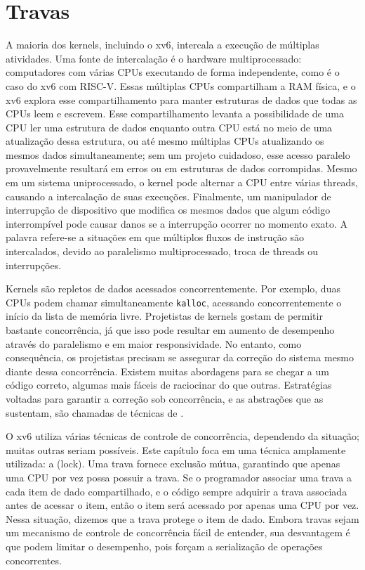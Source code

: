 \chapter{Travas}
\label{CH:LOCK}

A maioria dos kernels, incluindo o xv6, intercala a execução
de múltiplas atividades.
Uma fonte de intercalação é o hardware multiprocessado:
computadores com
várias CPUs executando de forma independente, como é o caso do xv6 com RISC-V.
Essas múltiplas CPUs compartilham a RAM física,
e o xv6 explora esse compartilhamento para manter
estruturas de dados que todas as CPUs leem e escrevem.
Esse compartilhamento levanta a possibilidade de
uma CPU ler uma estrutura de dados enquanto outra
CPU está no meio de uma atualização dessa estrutura, ou até mesmo
múltiplas CPUs atualizando os mesmos dados simultaneamente;
sem um projeto cuidadoso, esse acesso paralelo provavelmente
resultará em erros ou em estruturas de dados corrompidas.
Mesmo em um sistema uniprocessado, o kernel pode alternar a CPU entre
várias threads, causando a intercalação de suas execuções.
Finalmente, um manipulador de interrupção de dispositivo que modifica
os mesmos dados que algum código interrompível pode causar danos
se a interrupção ocorrer no momento exato.
A palavra
refere-se a situações em que
múltiplos fluxos de instrução são intercalados,
devido ao paralelismo multiprocessado,
troca de threads ou interrupções.

Kernels são repletos de dados acessados concorrentemente. Por exemplo, duas CPUs
podem chamar simultaneamente {\tt kalloc}, acessando concorrentemente
o início da lista de memória livre. Projetistas de kernels gostam de permitir
bastante concorrência, já que isso pode resultar em aumento de desempenho
através do paralelismo e em maior responsividade. No entanto, como consequência,
os projetistas precisam se assegurar da
correção do sistema mesmo diante dessa concorrência. Existem muitas abordagens
para se chegar a um código correto, algumas mais fáceis de raciocinar do que outras. Estratégias
voltadas para garantir a correção sob concorrência, e as abstrações que as sustentam,
são chamadas de técnicas de .

O xv6 utiliza várias técnicas de controle de concorrência, dependendo da
situação; muitas outras seriam possíveis. Este capítulo foca em uma técnica amplamente
utilizada: a  (lock). Uma trava fornece exclusão mútua,
garantindo que apenas uma CPU por vez possa possuir a trava. Se
o programador associar uma trava a cada item de dado compartilhado, e o
código sempre adquirir a trava associada antes de acessar o item, então o
item será acessado por apenas uma CPU por vez. Nessa situação, dizemos que
a trava protege o item de dado. Embora travas sejam um mecanismo de controle
de concorrência fácil de entender, sua desvantagem é que podem limitar
o desempenho, pois forçam a serialização de operações concorrentes.

